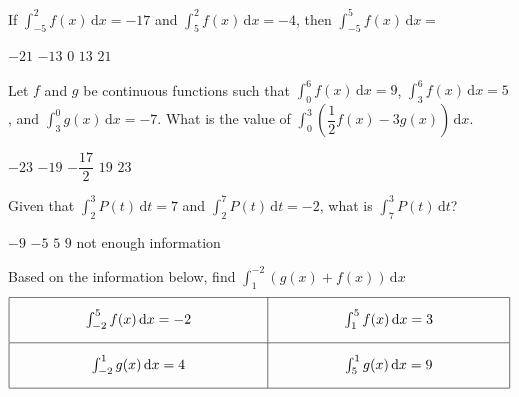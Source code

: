 \begin{questions}
    \question If $\int_{-5}^2 f(x) \,\mathrm{d}x = -17$ and $\int_5^2 f(x) \,\mathrm{d}x = -4$, then $\int_{-5}^5 f(x) \,\mathrm{d}x = $ \\

    \begin{oneparchoices}
        \choice $-21$
        \choice $-13$
        \choice $0$
        \choice $13$
        \choice $21$
    \end{oneparchoices} \par \horizontalline

    \question Let $f$ and $g$ be continuous functions such that $\int_0^6 f(x) \,\mathrm{d}x = 9$, $\int_3^6 f(x) \,\mathrm{d}x = 5$, and $\int_3^0 g(x) \,\mathrm{d}x = -7$. What is the value of $\int_0^3 \left(\dfrac{1}{2}f(x) - 3g(x)\right) \,\mathrm{d}x$. \\

    \begin{oneparchoices}
        \choice $-23$
        \choice $-19$
        \choice $-\dfrac{17}{2}$
        \choice $19$
        \choice $23$
    \end{oneparchoices} \par \horizontalline

    \question Given that $\int_2^3 P(t) \,\mathrm{d}t = 7$ and $\int_2^7 P(t) \,\mathrm{d}t = -2$, what is $\int_7^3 P(t) \,\mathrm{d}t$? \\

    \begin{oneparchoices}
        \choice $-9$
        \choice $-5$
        \choice $5$
        \choice $9$
        \choice not enough information
    \end{oneparchoices} \par \horizontalline

    \question Based on the information below, find $\int_1^{-2} (g(x) + f(x)) \,\mathrm{d}x$ \begin{align*}
        \arraycolsep=55pt\def\arraystretch{2.2} 
        \begin{array}[c]{|c|c|}
            \hline
            \int_{-2}^5 f(x) \,\mathrm{d}x = -2 & \int_1^5 f(x) \,\mathrm{d}x = 3 \\[5.5pt] \hline
            \int_{-2}^1 g(x) \,\mathrm{d}x = 4 & \int_5^1 g(x) \,\mathrm{d}x = 9 \\[5.5pt] 
            \hline
        \end{array}
    \end{align*}


\end{questions}
